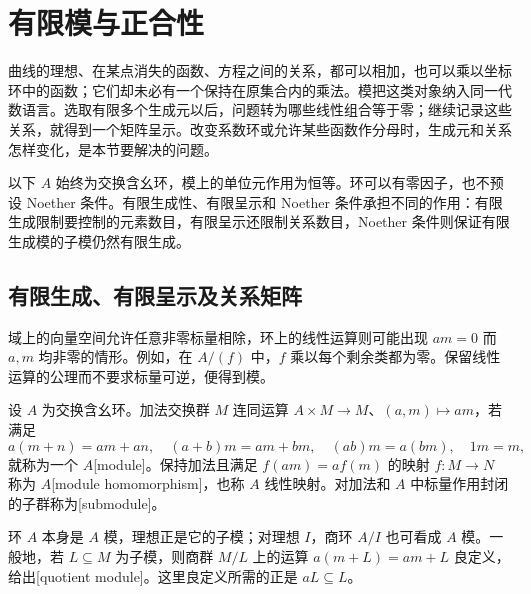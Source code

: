 
% 
% 

\section{有限模与正合性}
\label{g5:sec:0202}

曲线的理想、在某点消失的函数、方程之间的关系，都可以相加，也可以乘以坐标环中的函数；它们却未必有一个保持在原集合内的乘法。模把这类对象纳入同一代数语言。选取有限多个生成元以后，问题转为哪些线性组合等于零；继续记录这些关系，就得到一个矩阵呈示。改变系数环或允许某些函数作分母时，生成元和关系怎样变化，是本节要解决的问题。

\ProseParagraphBreak

以下 \(A\) 始终为交换含幺环，模上的单位元作用为恒等。环可以有零因子，也不预设 Noether 条件。有限生成性、有限呈示和 Noether 条件承担不同的作用：有限生成限制要控制的元素数目，有限呈示还限制关系数目，Noether 条件则保证有限生成模的子模仍然有限生成。

\subsection{有限生成、有限呈示及关系矩阵}
\label{g5:subsec:0202:01}

域上的向量空间允许任意非零标量相除，环上的线性运算则可能出现 \(am=0\) 而 \(a,m\) 均非零的情形。例如，在 \(A/(f)\) 中，\(f\) 乘以每个剩余类都为零。保留线性运算的公理而不要求标量可逆，便得到模。

\begin{definition}\label{g5:def:module}
	设 \(A\) 为交换含幺环。加法交换群 \(M\) 连同运算 \(A\times M\rightarrow M\)、\((a,m)\mapsto am\)，若满足
	\[
		a(m+n)=am+an,\quad
		(a+b)m=am+bm,\quad
		(ab)m=a(bm),\quad 1m=m,
	\]
	就称为一个 \(A\)[module]。保持加法且满足 \(f(am)=af(m)\) 的映射 \(f:M\rightarrow N\) 称为 \(A\)[module homomorphism]，也称 \(A\) 线性映射。对加法和 \(A\) 中标量作用封闭的子群称为[submodule]。
\end{definition}

环 \(A\) 本身是 \(A\) 模，理想正是它的子模；对理想 \(I\)，商环 \(A/I\) 也可看成 \(A\) 模。一般地，若 \(L\subseteq M\) 为子模，则商群 \(M/L\) 上的运算 \(a(m+L)=am+L\) 良定义，给出[quotient module]。这里良定义所需的正是 \(aL\subseteq L\)。

